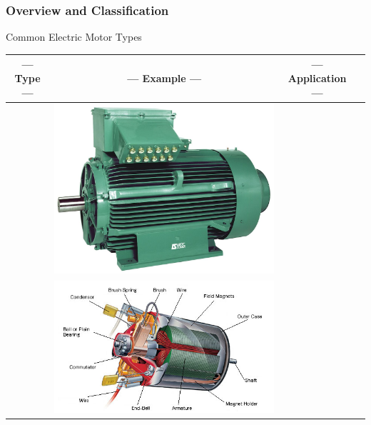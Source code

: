 \documentclass[fleqn]{beamer} %
\newcommand{\sectiontitleI}{Overview and Classification}
\begin{document}
	\begin{frame}[label=sectionI] \small
		\frametitle{\sectiontitleI}	
		
		Common Electric Motor Types \vspace{2mm}\\

		\begin{tabular}{|c|c|c|c|} \hline
			--- Type --- & --- Example --- & --- Application --- \\ \hline  
			& \includegraphics[scale=.05]{images/Ac-elektromotor-robuster-asynchronmotor.jpeg} & \\ \hline                  %
			& \includegraphics[scale=.29]{images/brushed_dcmotor.jpg} & \\ \hline                  %
 
		\end{tabular}

	\end{frame}
\end{document}
